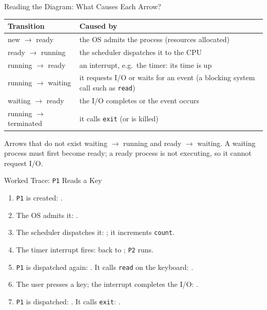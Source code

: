\documentclass[aspectratio=169]{beamer}
\begin{document}
\begin{frame}{Reading the Diagram: What Causes Each Arrow?}
  \footnotesize
  \renewcommand{\arraystretch}{1.25}
  \begin{tabular}{p{}p{}}
    \textbf{Transition} & \textbf{Caused by} \\
    \hline
    new $\to$ ready & the OS admits the process (resources allocated) \\
    ready $\to$ running & the scheduler dispatches it to the CPU \\
    running $\to$ ready & an interrupt, e.g.\ the timer: its time is up \\
    running $\to$ waiting & it requests I/O or waits for an event (a blocking
    system call such as \texttt{read}) \\
    waiting $\to$ ready & the I/O completes or the event occurs \\
    running $\to$ terminated & it calls \texttt{exit} (or is killed) \\
  \end{tabular}
  \vspace{0.3cm}
  \begin{block}{Arrows that do not exist}
    waiting $\to$ running and ready $\to$ waiting. A waiting process must
    first become ready; a ready process is not executing, so it cannot request
    I/O.
  \end{block}
\end{frame}

\begin{frame}{Worked Trace: \texttt{P1} Reads a Key}
  \begin{enumerate}
    \item \texttt{P1} is created: .
    \item The OS admits it: .
    \item The scheduler dispatches it: ; it increments
      \texttt{count}.
    \item The timer interrupt fires: back to ; \texttt{P2} runs.
    \item \texttt{P1} is dispatched again: . It calls
      \texttt{read} on the keyboard: .
    \item The user presses a key; the interrupt completes the I/O:
      .
    \item \texttt{P1} is dispatched: . It calls \texttt{exit}:
      .
  \end{enumerate}
  \vspace{0.1cm}
\end{frame}
\end{document}
